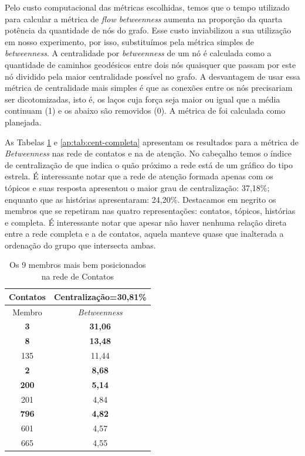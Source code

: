 Pelo custo computacional das métricas escolhidas, temos que o tempo utilizado
para calcular a métrica de \emph{flow betweenness} aumenta na proporção da quarta
potência da quantidade de nós do grafo. Esse custo inviabilizou a sua utilização
em nosso experimento, por isso, substituímos pela métrica simples de
\emph{betweenness}. A centralidade por \emph{betweenness} de um nó é calculada
como a quantidade de caminhos geodésicos entre dois nós quaisquer que passam por
este nó dividido pela maior centralidade possível no grafo. A desvantagem de usar
essa métrica de centralidade mais simples é que as conexões entre os nós
precisariam ser dicotomizadas, isto é, os laços cuja força seja maior ou igual
que a média continuam (1) e os abaixo são removidos (0). A métrica de
\citeauthor{Bonacich1987} foi calculada como planejada.

As Tabelas \ref{ap:tab:cent-contatos} e \ref{ap:tab:cent-completa} apresentam os
resultados para a métrica de \emph{Betweenness} nas rede de contatos e na de
atenção. No cabeçalho temos o índice de centralização de
\citeauthor{Freeman1979} que indica o quão próximo a rede está de um gráfico do
tipo estrela. É interessante notar que a rede de atenção formada apenas com os
tópicos e suas resposta apresentou o maior grau de centralização: 37,18\%;
enquanto que as histórias apresentaram: 24,20\%. Destacamos em negrito os
membros que se repetiram nas quatro representações: contatos, tópicos, histórias
e completa. É interessante notar que apesar não haver nenhuma relação direta
entre a rede completa e a de contatos, aquela manteve quase que inalterada a
ordenação do grupo que intersecta ambas.

\begin{table}[htbp]
	\setlength{\arrayrulewidth}{2\arrayrulewidth}  %
	\setlength{\belowcaptionskip}{10pt}  %
	\caption{Os 9 membros mais bem posicionados na rede de Contatos} \centering   
	\begin{tabular}{| c | c |}
	\hline
	Contatos & Centralização=30,81\% \\ \hline\hline
	Membro & \emph{Betweenness} \\ \hline
	\textbf{3} & \textbf{31,06} \\
	\textbf{8} & \textbf{13,48} \\
	135 & 11,44 \\
	\textbf{2} & \textbf{8,68} \\
	\textbf{200} & \textbf{5,14} \\
	201 & 4,84 \\
	\textbf{796} & \textbf{4,82} \\
	601 & 4,57 \\
	665 & 4,55 \\ \hline
	\end{tabular}
	\label{ap:tab:cent-contatos}
\end{table}

